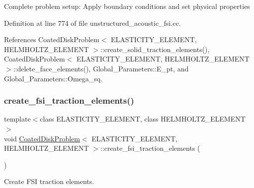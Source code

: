 Complete problem setup\+: Apply boundary conditions and set physical properties 

Definition at line 774 of file unstructured\+\_\+acoustic\+\_\+fsi.\+cc.



References Coated\+Disk\+Problem$<$ E\+L\+A\+S\+T\+I\+C\+I\+T\+Y\+\_\+\+E\+L\+E\+M\+E\+N\+T, H\+E\+L\+M\+H\+O\+L\+T\+Z\+\_\+\+E\+L\+E\+M\+E\+N\+T $>$\+::create\+\_\+solid\+\_\+traction\+\_\+elements(), Coated\+Disk\+Problem$<$ E\+L\+A\+S\+T\+I\+C\+I\+T\+Y\+\_\+\+E\+L\+E\+M\+E\+N\+T, H\+E\+L\+M\+H\+O\+L\+T\+Z\+\_\+\+E\+L\+E\+M\+E\+N\+T $>$\+::delete\+\_\+face\+\_\+elements(), Global\+\_\+\+Parameters\+::\+E\+\_\+pt, and Global\+\_\+\+Parameters\+::\+Omega\+\_\+sq.

\mbox{\label{classCoatedDiskProblem_a143908e8db74ad6bd8b7efaaa26c78c3}} 
\subsubsection{\texorpdfstring{create\+\_\+fsi\+\_\+traction\+\_\+elements()}{create\_fsi\_traction\_elements()}\hspace{0.1cm}{\footnotesize\ttfamily [1/2]}}
{\footnotesize\ttfamily template$<$class E\+L\+A\+S\+T\+I\+C\+I\+T\+Y\+\_\+\+E\+L\+E\+M\+E\+NT, class H\+E\+L\+M\+H\+O\+L\+T\+Z\+\_\+\+E\+L\+E\+M\+E\+NT$>$ \\
void \hyperlink{classCoatedDiskProblem}{Coated\+Disk\+Problem}$<$ E\+L\+A\+S\+T\+I\+C\+I\+T\+Y\+\_\+\+E\+L\+E\+M\+E\+NT, H\+E\+L\+M\+H\+O\+L\+T\+Z\+\_\+\+E\+L\+E\+M\+E\+NT $>$\+::create\+\_\+fsi\+\_\+traction\+\_\+elements (\begin{DoxyParamCaption}{ }\end{DoxyParamCaption})\hspace{0.3cm}{\ttfamily [private]}}



Create F\+SI traction elements. 

\mbox{\label{classCoatedDiskProblem_a143908e8db74ad6bd8b7efaaa26c78c3}} 
